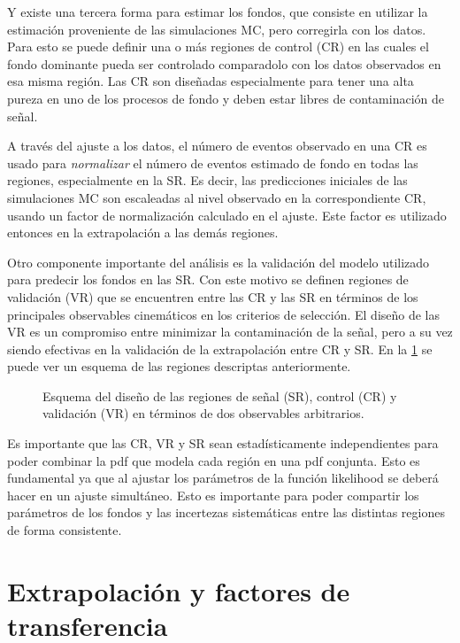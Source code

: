 Y existe una tercera forma para estimar los fondos, que consiste en utilizar la
estimación proveniente de las simulaciones MC, pero corregirla con los datos.
Para esto se puede definir una o más regiones de control (CR) en las cuales el
fondo dominante pueda ser controlado comparadolo con los datos observados en esa
misma región. Las CR son diseñadas especialmente para tener una alta pureza en
uno de los procesos de fondo y deben estar libres de contaminación de señal.

A través del ajuste a los datos, el número de eventos observado en una CR es
usado para \emph{normalizar} el número de eventos estimado de fondo en todas las
regiones, especialmente en la SR. Es decir, las predicciones iniciales de las
simulaciones MC son escaleadas al nivel observado en la correspondiente CR,
usando un factor de normalización calculado en el ajuste. Este factor es
utilizado entonces en la extrapolación a las demás regiones.

Otro componente importante del análisis es la validación del modelo utilizado
para predecir los fondos en las SR. Con este motivo se definen regiones de
validación (VR) que se encuentren entre las CR y las SR en términos de los
principales observables cinemáticos en los criterios de selección. El diseño de
las VR es un compromiso entre minimizar la contaminación de la señal, pero a su
vez siendo efectivas en la validación de la extrapolación entre CR y SR. En la
\cref{fig:regions_sketch} se puede ver un esquema de las regiones descriptas
anteriormente.

\begin{figure}[h]
  \centering 
  \caption{Esquema del diseño de las regiones de señal (SR), control (CR) y
    validación (VR) en términos de dos observables arbitrarios.}
  \label{fig:regions_sketch}
\end{figure}

Es importante que las CR, VR y SR sean estadísticamente independientes para
poder combinar la pdf que modela cada región en una pdf conjunta. Esto es
fundamental ya que al ajustar los parámetros de la función likelihood se deberá
hacer en un ajuste simultáneo. Esto es importante para poder compartir los
parámetros de los fondos y las incertezas sistemáticas entre las distintas
regiones de forma consistente.

\section{Extrapolación y factores de transferencia}


